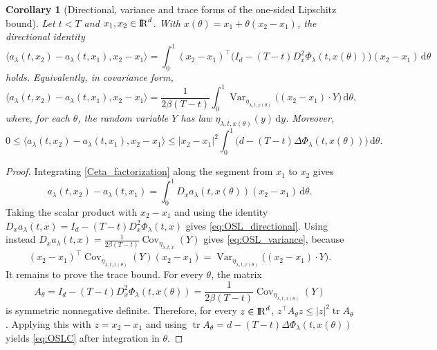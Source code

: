 \documentclass[11pt]{amsart}
\def\R{\mathrm{I\kern-0.21emR}}
\newcommand{\dd}{\,\mathrm{d}}
\renewcommand{\leq}{\leqslant}
\renewcommand{\Vert}{|}
\numberwithin{equation}{section}
\numberwithin{figure}{section}
\newtheorem{corollary}[theorem]{Corollary}%
\theoremstyle{definition}\newtheorem{remark}[theorem]{Remark}%
\begin{document}
\begin{corollary}[Directional, variance and trace forms of the one-sided Lipschitz bound]\label{factorized_osl_cor}
Let $t<T$ and $x_1,x_2\in \R^d$. With $x(\theta)=x_1+\theta(x_2-x_1)$, the directional identity
\begin{equation}\label{eq:OSL_directional}
\big\langle a_\lambda(t,x_2)-a_\lambda(t,x_1),x_2-x_1\big\rangle 
= \int_0^1 (x_2-x_1)^\top \big(I_d-(T-t)D_x^2\Phi_\lambda(t,x(\theta))\big)(x_2-x_1)\dd\theta
\end{equation}
holds. Equivalently, in covariance form,
\begin{equation}\label{eq:OSL_variance}
\big\langle a_\lambda(t,x_2)-a_\lambda(t,x_1),x_2-x_1\big\rangle
= \frac{1}{2\beta(T-t)}\int_0^1 \operatorname{Var}_{\eta_{\lambda,t,x(\theta)}}\big((x_2-x_1)\cdot Y\big)\dd\theta,
\end{equation}
where, for each $\theta$, the random variable $Y$ has law $\eta_{\lambda,t,x(\theta)}(y)\dd y$. Moreover,
\begin{equation}\label{eq:OSLC}
0 \leq \big\langle a_\lambda(t,x_2)-a_\lambda(t,x_1),x_2-x_1\big\rangle
\leq \Vert x_2-x_1\Vert^2\int_0^1\big(d-(T-t)\Delta\Phi_\lambda(t,x(\theta))\big)\dd\theta.
\end{equation}
\end{corollary}

\begin{proof}
Integrating \eqref{Ceta_factorization} along the segment from $x_1$ to $x_2$ gives
$$
 a_\lambda(t,x_2)-a_\lambda(t,x_1) = \int_0^1D_xa_\lambda(t,x(\theta))(x_2-x_1)\dd\theta.
$$
Taking the scalar product with $x_2-x_1$ and using the identity
$D_xa_\lambda(t,x)=I_d-(T-t)D_x^2\Phi_\lambda(t,x)$
gives \eqref{eq:OSL_directional}. Using instead
$D_xa_\lambda(t,x)=\frac{1}{2\beta(T-t)}\operatorname{Cov}_{\eta_{\lambda,t,x}}(Y)$
gives \eqref{eq:OSL_variance}, because
$$
(x_2-x_1)^\top\operatorname{Cov}_{\eta_{\lambda,t,x(\theta)}}(Y)(x_2-x_1)
= \operatorname{Var}_{\eta_{\lambda,t,x(\theta)}}\big((x_2-x_1)\cdot Y\big).
$$
It remains to prove the trace bound. For every $\theta$, the matrix
$$
A_\theta=I_d-(T-t)D_x^2\Phi_\lambda(t,x(\theta))
= \frac{1}{2\beta(T-t)}\operatorname{Cov}_{\eta_{\lambda,t,x(\theta)}}(Y)
$$
is symmetric nonnegative definite. Therefore, for every $z\in\R^d$,
$z^\top A_\theta z \leq \Vert z\Vert^2\operatorname{tr} A_\theta$.
Applying this with $z=x_2-x_1$ and using
$\operatorname{tr}A_\theta=d-(T-t)\Delta\Phi_\lambda(t,x(\theta))$
yields \eqref{eq:OSLC} after integration in $\theta$.
\end{proof}
\end{document}
